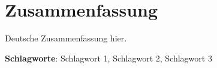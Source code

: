 \chapter*{Zusammenfassung}
Deutsche Zusammenfassung hier.

\vfill
\noindent\textbf{Schlagworte}: Schlagwort 1, Schlagwort 2, Schlagwort 3

